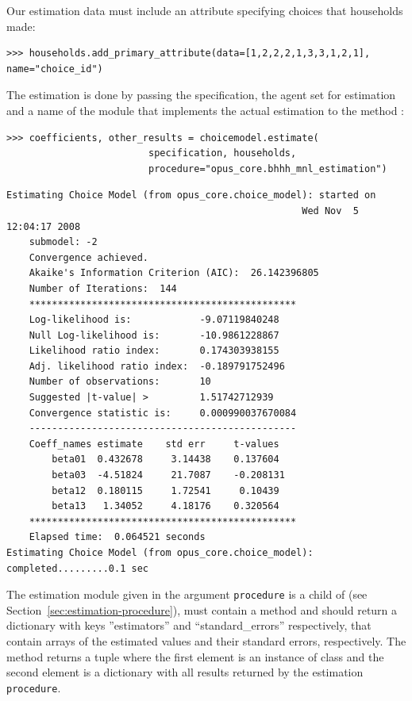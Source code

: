 Our estimation data must include an attribute specifying choices that
households made:
\begin{verbatim}
>>> households.add_primary_attribute(data=[1,2,2,2,1,3,3,1,2,1], name="choice_id")
\end{verbatim}

The estimation is done by passing the specification, the agent set for
estimation and a name of the module that implements the actual estimation to
the method :

\begin{verbatim}
>>> coefficients, other_results = choicemodel.estimate(
                         specification, households, 
                         procedure="opus_core.bhhh_mnl_estimation")
\end{verbatim}
\begin{verbatim}
Estimating Choice Model (from opus_core.choice_model): started on 
                                                    Wed Nov  5 12:04:17 2008
    submodel: -2
    Convergence achieved.
    Akaike's Information Criterion (AIC):  26.142396805
    Number of Iterations:  144
    ***********************************************
    Log-likelihood is:            -9.07119840248
    Null Log-likelihood is:       -10.9861228867
    Likelihood ratio index:       0.174303938155
    Adj. likelihood ratio index:  -0.189791752496
    Number of observations:       10
    Suggested |t-value| >         1.51742712939
    Convergence statistic is:     0.000990037670084
    -----------------------------------------------
    Coeff_names	estimate	std err		t-values
        beta01	0.432678	 3.14438	0.137604
        beta03	-4.51824	 21.7087	-0.208131
        beta12	0.180115	 1.72541	 0.10439
        beta13	 1.34052	 4.18176	0.320564
    ***********************************************
    Elapsed time:  0.064521 seconds
Estimating Choice Model (from opus_core.choice_model): completed.........0.1 sec

\end{verbatim}
The estimation module given in the argument \verb|procedure| is a child of
 (see Section~\ref{sec:estimation-procedure}), must
contain a method  and should return a dictionary with keys
''estimators'' and ``standard_errors'' respectively, that contain arrays of
the estimated values and their standard errors, respectively.  The 
method returns a tuple where the first element is an instance of
class  and the second element is a dictionary with all
results returned by the estimation \verb|procedure|.

